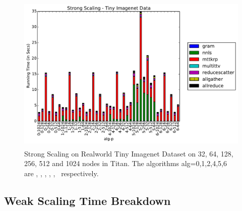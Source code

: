 \begin{figure}
\includegraphics[width=\textwidth, height=3in]{data/plots/ssrw_tinyimagenet_breakdown.pdf}
\caption {Strong Scaling on Realworld Tiny Imagenet Dataset on 32, 64, 128, 256, 512 and 1024 nodes in Titan. The algorithms alg=0,1,2,4,5,6 are \MU, \HALS, \BPP, \ADMM, \Nestrov, \CPALS\ respectively.}
\label{fig:synstrongscaling}
\end{figure}

\subsection{Weak Scaling Time Breakdown}

